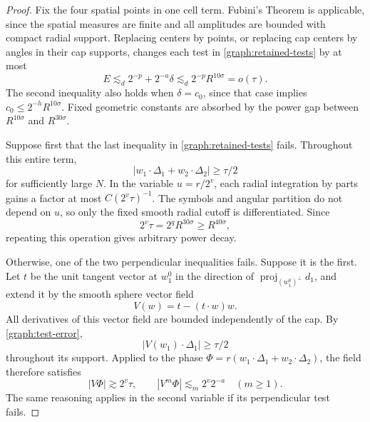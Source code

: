 \begin{proof}
Fix the four spatial points in one cell term.  Fubini's Theorem is
applicable, since the spatial measures are finite and all amplitudes
are bounded with compact radial support.  Replacing centers by points,
or replacing cap centers by angles in their cap supports, changes
each test in \eqref{graph:retained-tests} by at most
\begin{equation}\label{graph:test-error}
 E\lesssim_d2^{-p}+2^{-a}\delta
 \lesssim_d2^{-p}R^{10\sigma}=o(\tau).
\end{equation}
The second inequality also holds when $\delta=c_0$, since that case
implies $c_0\le2^{-h}R^{10\sigma}$.  Fixed geometric constants are
absorbed by the power gap between $R^{10\sigma}$ and $R^{30\sigma}$.

Suppose first that the last inequality in
\eqref{graph:retained-tests} fails.  Throughout this entire term,
\[
 |w_1\cdot\Delta_1+w_2\cdot\Delta_2|\ge\tau/2
\]
for sufficiently large $N$.  In the variable $u=r/2^v$, each radial
integration by parts gains a factor at most $C(2^v\tau)^{-1}$.
The symbols and angular partition do not depend on $u$, so only the
fixed smooth radial cutoff is differentiated.  Since
\begin{equation}\label{graph:oscillation-size}
 2^v\tau=2^qR^{30\sigma}\ge R^{40\sigma},
\end{equation}
repeating this operation gives arbitrary power decay.

Otherwise, one of the two perpendicular inequalities fails.  Suppose
it is the first.  Let $t$ be the unit tangent vector at $w_1^0$ in the
direction of $\operatorname{proj}_{(w_1^0)^\perp}d_1$, and extend it
by the smooth sphere vector field
\[
 V(w)=t-(t\cdot w)w.
\]
All derivatives of this vector field are bounded independently of the
cap.  By \eqref{graph:test-error},
\[
 |V(w_1)\cdot\Delta_1|\ge\tau/2
\]
throughout its support.  Applied to the phase
$\Phi=r(w_1\cdot\Delta_1+w_2\cdot\Delta_2)$, the field therefore
satisfies
\[
 |V\Phi|\gtrsim2^v\tau,
 \qquad |V^m\Phi|\lesssim_m2^v2^{-a}\quad(m\ge1).
\]
The same reasoning applies in the second variable if its perpendicular
test fails.


\end{proof}
